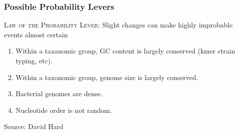 \documentclass[10pt, compress]{beamer}
\begin{document}
\begin{frame}[fragile]
  \frametitle{Possible Probability Levers}
    {\small\textsc{Law of the Probability Lever}: \footnotesize{Slight changes can make highly improbable events almost certain}}
  \begin{enumerate}[<+- | alert@+>]
  \item Within a taxanomic group, GC content is largely conserved (kmer strain typing, etc).
\item Within a taxonomic group, genome size is largely conserved.
\item Bacterial genomes are dense.
\item Nucleotide order is not random.
\end{enumerate}
\vfill
{\tiny Source: David Hard}
\end{frame}
\end{document}
